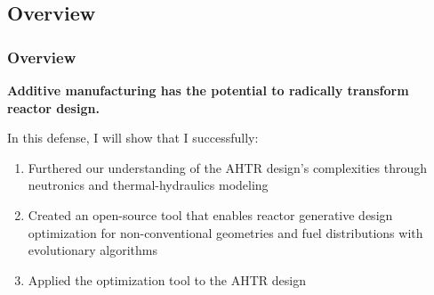 \subsection{Overview}
    \begin{frame}
        \frametitle{Overview}
        \textbf{Additive manufacturing has the potential to radically transform reactor design.}
        \vspace{0.5cm}

        In this defense, I will show that I successfully: 
        \begin{enumerate}
            \item Furthered our understanding of the \gls{AHTR} design's complexities 
            through neutronics and thermal-hydraulics modeling
            \item Created an open-source tool that enables reactor generative 
            design optimization for non-conventional geometries and fuel 
            distributions with evolutionary algorithms
            \item Applied the optimization tool to the \gls{AHTR} design 
        \end{enumerate}
    \end{frame}

